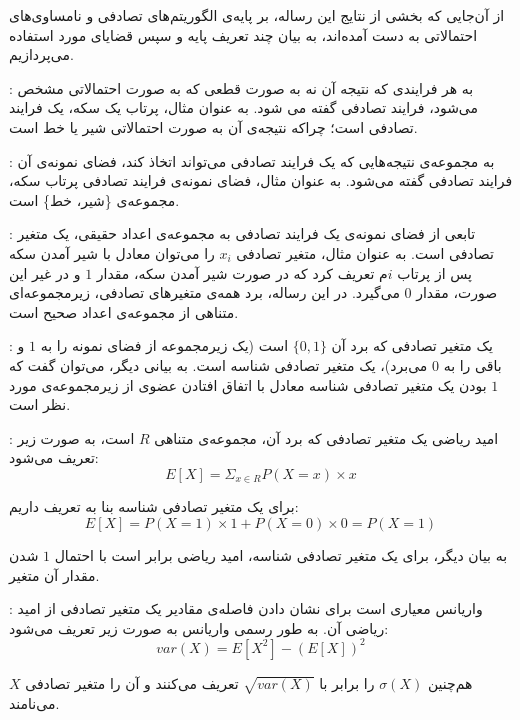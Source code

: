 از آن‌جایی که بخشی از نتایج این رساله، بر پایه‌ی الگوریتم‌های تصادفی و نامساوی‌های احتمالاتی به دست آمده‌اند، به بیان چند تعریف پایه و سپس قضایای مورد استفاده می‌پردازیم.


 :
به هر فرایندی که نتیجه آن نه به صورت قطعی که به صورت احتمالاتی مشخص می‌شود، فرایند تصادفی گفته می شود. به عنوان مثال، پرتاب یک سکه، یک فرایند تصادفی است؛ چراکه نتیجه‌ی آن به صورت احتمالاتی شیر یا خط است. 

 :
به مجموعه‌ی نتیجه‌هایی که یک فرایند تصادفی می‌تواند اتخاذ کند، فضای نمونه‌ی آن فرایند تصادفی گفته می‌شود. به عنوان مثال، فضای نمونه‌ی فرایند تصادفی پرتاب سکه، مجموعه‌ی \{شیر، خط\} است.

 :
تابعی از فضای نمونه‌ی یک فرایند تصادفی به مجموعه‌ی اعداد حقیقی، یک متغیر تصادفی است. به عنوان مثال، متغیر تصادفی $x_i$ را می‌توان معادل با شیر آمدن سکه پس از پرتاب $i$م  تعریف کرد که در صورت شیر آمدن سکه، مقدار $1$ و در غیر این صورت، مقدار $0$ می‌گیرد. در این رساله، برد همه‌ی متغیر‌های تصادفی، زیر‌مجموعه‌ای متناهی از مجموعه‌ی اعداد صحیح است.

 :
یک متغیر تصادفی که برد آن $\{0, 1\}$ است (یک زیر‌مجموعه از فضای نمونه را به $1$ و باقی را به $0$ می‌برد)، یک متغیر تصادفی شناسه است. به بیانی دیگر، می‌توان گفت که $1$ بودن یک متغیر تصادفی شناسه معادل با اتفاق افتادن عضوی از زیر‌مجموعه‌ی مورد نظر است.

 :
امید ریاضی یک متغیر تصادفی که برد آن، مجموعه‌ی متناهی $R$ است، به صورت زیر تعریف می‌شود:
$$E[X] = \Sigma_{x \in R} P(X=x) \times x$$

برای یک متغیر تصادفی شناسه بنا به تعریف داریم:
$$E[X] = P(X=1)\times 1 + P(X=0)\times 0 = P(X=1)$$

به بیان دیگر، برای یک متغیر تصادفی شناسه، امید ریاضی برابر است با احتمال $1$ شدن مقدار آن متغیر.

 :
واریانس معیاری است برای نشان دادن فاصله‌ی مقادیر یک متغیر تصادفی از امید ریاضی آن. به طور رسمی واریانس به صورت زیر تعریف می‌شود: 
$$var(X) = E[X^2] - {{(E[X])}^2}$$

هم‌چنین $\sigma(X)$ را برابر با $\sqrt{var(X)}$ تعریف می‌کنند و آن را  متغیر تصادفی $X$ می‌نامند.

%


